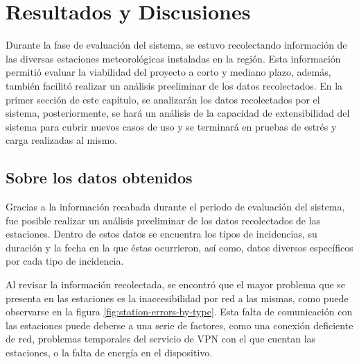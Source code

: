 \chapter{Resultados y Discusiones}


Durante la fase de evaluación del sistema, se estuvo recolectando información de las diversas estaciones meteorológicas instaladas en la región. Esta información permitió evaluar la viabilidad del proyecto a corto y mediano plazo, además, también facilitó realizar un análisis preeliminar de los datos recolectados. En la primer sección de este capítulo, se analizarán los datos recolectados por el sistema, posteriormente, se hará un análisis de la capacidad de extensibilidad del sistema para cubrir nuevos casos de uso y se terminará en pruebas de estrés y carga realizadas al mismo.

\section{Sobre los datos obtenidos}

Gracias a la información recabada durante el periodo de evaluación del sistema, fue posible realizar un análisis preeliminar de los datos recolectados de las estaciones. Dentro de estos datos se encuentra los tipos de incidencias, su duración y la fecha en la que éstas ocurrieron, así como, datos diversos específicos por cada tipo de incidencia.

Al revisar la información recolectada, se encontró que el mayor problema que se presenta en las estaciones es la inaccesibilidad por red a las mismas, como puede observarse en la figura \ref{fig:station-errors-by-type}. Esta falta de comunicación con las estaciones puede deberse a una serie de factores, como una conexión deficiente de red, problemas temporales del servicio de VPN con el que cuentan las estaciones, o la falta de energía en el dispositivo.


